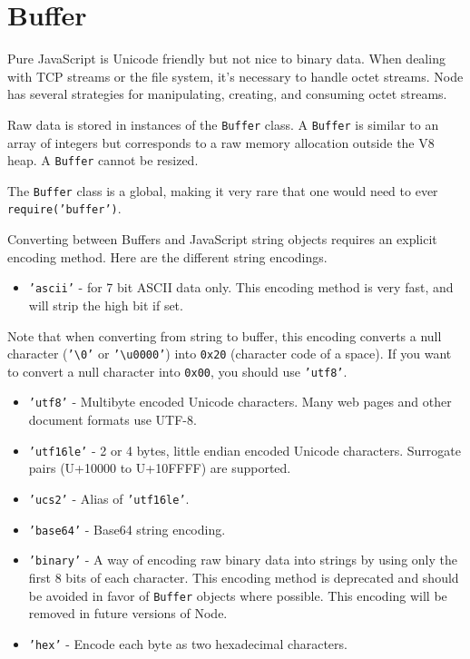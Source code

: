\section{Buffer}

\begin{Shaded}
\begin{Highlighting}[]
\NormalTok{: } 
\end{Highlighting}
\end{Shaded}

Pure JavaScript is Unicode friendly but not nice to binary data. When
dealing with TCP streams or the file system, it's necessary to handle
octet streams. Node has several strategies for manipulating, creating,
and consuming octet streams.

Raw data is stored in instances of the \texttt{Buffer} class. A
\texttt{Buffer} is similar to an array of integers but corresponds to a
raw memory allocation outside the V8 heap. A \texttt{Buffer} cannot be
resized.

The \texttt{Buffer} class is a global, making it very rare that one
would need to ever \texttt{require('buffer')}.

Converting between Buffers and JavaScript string objects requires an
explicit encoding method. Here are the different string encodings.

\begin{itemize}
\item
  \texttt{'ascii'} - for 7 bit ASCII data only. This encoding method is
  very fast, and will strip the high bit if set.
\end{itemize}

Note that when converting from string to buffer, this encoding converts
a null character (\texttt{'\textbackslash{}0'} or
\texttt{'\textbackslash{}u0000'}) into \texttt{0x20} (character code of
a space). If you want to convert a null character into \texttt{0x00},
you should use \texttt{'utf8'}.

\begin{itemize}
\item
  \texttt{'utf8'} - Multibyte encoded Unicode characters. Many web pages
  and other document formats use UTF-8.
\item
  \texttt{'utf16le'} - 2 or 4 bytes, little endian encoded Unicode
  characters. Surrogate pairs (U+10000 to U+10FFFF) are supported.
\item
  \texttt{'ucs2'} - Alias of \texttt{'utf16le'}.
\item
  \texttt{'base64'} - Base64 string encoding.
\item
  \texttt{'binary'} - A way of encoding raw binary data into strings by
  using only the first 8 bits of each character. This encoding method is
  deprecated and should be avoided in favor of \texttt{Buffer} objects
  where possible. This encoding will be removed in future versions of
  Node.
\item
  \texttt{'hex'} - Encode each byte as two hexadecimal characters.
\end{itemize}

